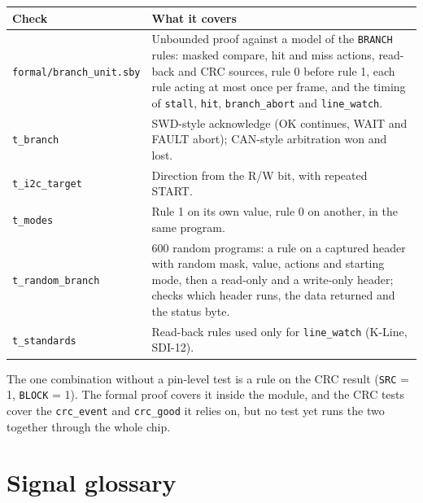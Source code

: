\documentclass[11pt,a4paper]{article}
\newcommand{\sig}[1]{\texttt{#1}}
\begin{document}
\begin{center}
\begin{tabularx}{\linewidth}{@{}l L@{}}
\toprule
Check & What it covers \\
\midrule
\sig{formal/branch\_unit.sby} & Unbounded proof against a model of the \sig{BRANCH} rules: masked compare, hit and miss actions, read-back and CRC sources, rule 0 before rule 1, each rule acting at most once per frame, and the timing of \sig{stall}, \sig{hit}, \sig{branch\_abort} and \sig{line\_watch}. \\
\sig{t\_branch} & SWD-style acknowledge (OK continues, WAIT and FAULT abort); CAN-style arbitration won and lost. \\
\sig{t\_i2c\_target} & Direction from the R/W bit, with repeated START. \\
\sig{t\_modes} & Rule 1 on its own value, rule 0 on another, in the same program. \\
\sig{t\_random\_branch} & 600 random programs: a rule on a captured header with random mask, value, actions and starting mode, then a read-only and a write-only header; checks which header runs, the data returned and the status byte. \\
\sig{t\_standards} & Read-back rules used only for \sig{line\_watch} (K-Line, SDI-12). \\
\bottomrule
\end{tabularx}
\end{center}

The one combination without a pin-level test is a rule on the CRC result (\sig{SRC} = 1, \sig{BLOCK} = 1). The formal proof covers it inside the module, and the CRC tests cover the \sig{crc\_event} and \sig{crc\_good} it relies on, but no test yet runs the two together through the whole chip.

\section{Signal glossary}
\end{document}
